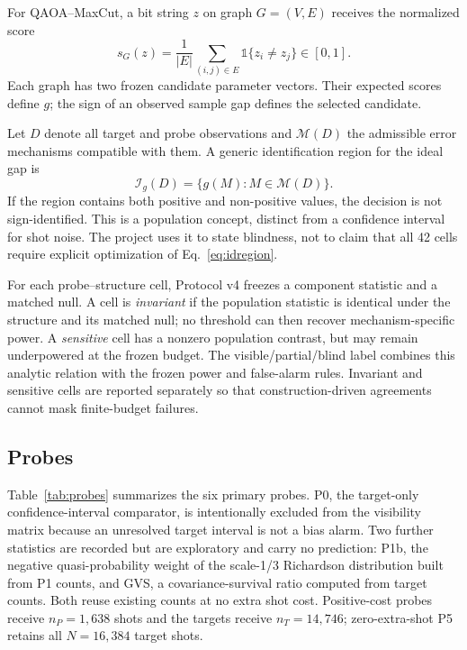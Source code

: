 \documentclass[10pt,twocolumn]{article}
\newcommand{\ind}{\mathbb{1}}
\begin{document}
For QAOA--MaxCut\cite{farhi2014}, a bit string $z$ on graph $G=(V,E)$ receives
the normalized score
\begin{equation}
  s_G(z)=\frac{1}{|E|}\sum_{(i,j)\in E}\ind\{z_i\neq z_j\}\in[0,1].
\end{equation}
Each graph has two frozen candidate parameter vectors. Their expected scores
define $g$; the sign of an observed sample gap defines the selected candidate.

Let $D$ denote all target and probe observations and $\mathcal M(D)$ the
admissible error mechanisms compatible with them. A generic identification
region for the ideal gap is
\begin{equation}
  \mathcal I_g(D)=\{g(M):M\in\mathcal M(D)\}.
  \label{eq:idregion}
\end{equation}
If the region contains both positive and non-positive values, the decision is
not sign-identified. This is a population concept, distinct from a confidence
interval for shot noise. The project uses it to state blindness, not to claim
that all 42 cells require explicit optimization of Eq.~\eqref{eq:idregion}.

For each probe--structure cell, Protocol v4 freezes a component statistic and
a matched null. A cell is \emph{invariant} if the population statistic is
identical under the structure and its matched null; no threshold can then
recover mechanism-specific power. A \emph{sensitive} cell has a nonzero
population contrast, but may remain underpowered at the frozen budget. The
visible/partial/blind label combines this analytic relation with the frozen
power and false-alarm rules. Invariant and sensitive cells are reported
separately so that construction-driven agreements cannot mask finite-budget
failures.

\subsection{Probes}

Table~\ref{tab:probes} summarizes the six primary probes. P0, the target-only
confidence-interval comparator, is intentionally excluded from the visibility
matrix because an unresolved target interval is not a bias alarm. Two further
statistics are recorded but are exploratory and carry no prediction: P1b, the
negative quasi-probability weight of the scale-1/3 Richardson distribution
built from P1 counts, and GVS, a covariance-survival ratio computed from target
counts. Both reuse existing counts at no extra shot cost. Positive-cost
probes receive $n_P=1{,}638$ shots and the targets receive $n_T=14{,}746$;
zero-extra-shot P5 retains all $N=16{,}384$ target shots.
\end{document}
